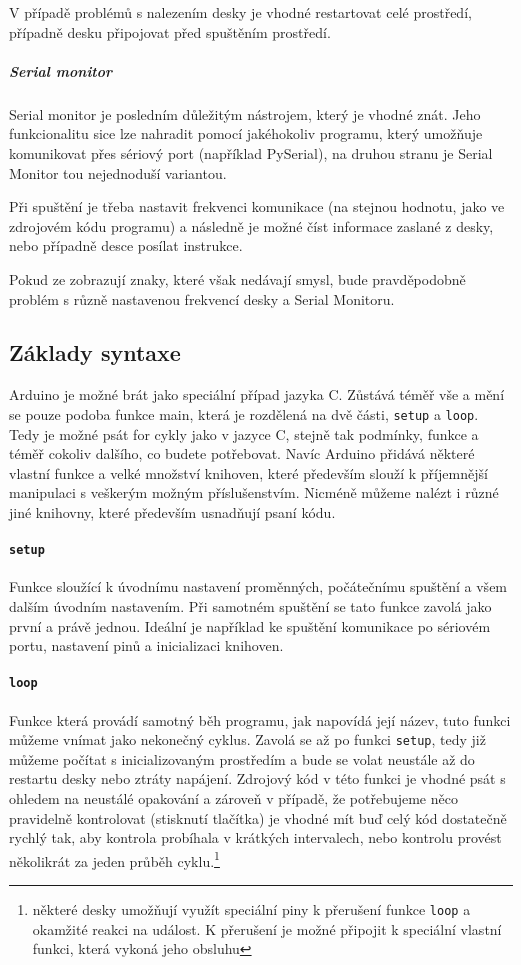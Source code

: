 \documentclass[12pt,titlepage]{article}
\begin{document}
			V případě problémů s nalezením desky je vhodné restartovat celé prostředí, případně desku připojovat před spuštěním prostředí.

		\subparagraph{Serial monitor}
			Serial monitor je posledním důležitým nástrojem, který je vhodné znát. Jeho funkcionalitu sice lze nahradit pomocí jakéhokoliv programu, který umožňuje komunikovat přes sériový port (například PySerial), na druhou stranu je Serial Monitor tou nejednoduší variantou.

			Při spuštění je třeba nastavit frekvenci komunikace (na stejnou hodnotu, jako ve zdrojovém kódu programu) a následně je možné číst informace zaslané z desky, nebo případně desce posílat instrukce.

			Pokud ze zobrazují znaky, které však nedávají smysl, bude pravděpodobně problém s různě nastavenou frekvencí desky a Serial Monitoru.


	\subsection{Základy syntaxe}
			Arduino je možné brát jako speciální případ jazyka C. Zůstává téměř vše a mění se pouze podoba funkce main, která je rozdělená na dvě části, \texttt{setup} a \texttt{loop}.
			Tedy je možné psát for cykly jako v jazyce C, stejně tak podmínky, funkce a téměř cokoliv dalšího, co budete potřebovat. Navíc Arduino přidává některé vlastní funkce a velké množství knihoven, které především slouží k příjemnější manipulaci s veškerým možným příslušenstvím. Nicméně můžeme nalézt i různé jiné knihovny, které především usnadňují psaní kódu.

		\paragraph{\textbf{\texttt{setup}}}
			Funkce sloužící k úvodnímu nastavení proměnných, počátečnímu spuštění a všem dalším úvodním nastavením. Při samotném spuštění se tato funkce zavolá jako první a právě jednou. Ideální je například ke spuštění komunikace po sériovém portu, nastavení pinů a inicializaci knihoven.

		\paragraph{\textbf{\texttt{loop}}}
			Funkce která provádí samotný běh programu, jak napovídá její název, tuto funkci můžeme vnímat jako nekonečný cyklus. Zavolá se až po funkci \texttt{setup}, tedy již můžeme počítat s inicializovaným prostředím a bude se volat neustále až do restartu desky nebo ztráty napájení. Zdrojový kód v této funkci je vhodné psát s ohledem na neustálé opakování a zároveň v případě, že potřebujeme něco pravidelně kontrolovat (stisknutí tlačítka) je vhodné mít buď celý kód dostatečně rychlý tak, aby kontrola probíhala v krátkých intervalech, nebo kontrolu provést několikrát za jeden průběh cyklu.\footnote{některé desky umožňují využít speciální piny k přerušení funkce \texttt{loop} a okamžité reakci na událost. K přerušení je možné připojit k speciální vlastní funkci, která vykoná jeho obsluhu}
\end{document}

